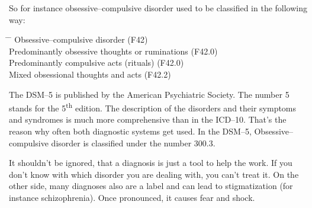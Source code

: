 \documentclass[../main.tex]{subfiles}
\begin{document}
So for instance obsessive--compulsive disorder used to be classified in the following way:

\begin{tabbing}
  \hspace{2cm} \= \hspace{1cm} \= \kill
  \>Obsessive--compulsive disorder (F42) \\
  \> \> Predominantly obsessive thoughts or ruminations (F42.0)\\
  \> \> Predominantly compulsive acts (rituals) (F42.0) \\
  \> \> Mixed obsessional thoughts and acts (F42.2) \\
\end{tabbing}

The DSM--5 is published by the American Psychiatric Society.
The number 5 stands for the 5\textsuperscript{th} edition.
The description of the disorders and their symptoms and syndromes is much more comprehensive than in the ICD--10.
That's the reason why often both diagnostic systems get used.
In the DSM--5, Obsessive--compulsive disorder is classified under the number 300.3.

It shouldn't be ignored, that a diagnosis is just a tool to help the work.
If you don't know with which disorder you are dealing with, you can't treat it.
On the other side, many diagnoses also are a label and can lead to stigmatization (for instance schizophrenia).
Once pronounced, it causes fear and shock.
\end{document}

